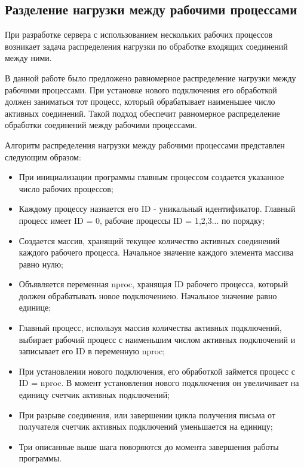 \documentclass[a4paper,12pt]{report}
\begin{document}
\subsection{Разделение нагрузки между рабочими процессами}

При разработке сервера с использованием нескольких рабочих процессов возникает задача распределения нагрузки по обработке входящих соединений между ними. 

В данной работе было предложено равномерное распределение нагрузки между рабочими процессами. При установке нового подключения его обработкой должен заниматься тот процесс, который обрабатывает наименьшее число активных соединений. Такой подход обеспечит равномерное распределение обработки соединений между рабочими процессами.

Алгоритм распределения нагрузки между рабочими процессами представлен следующим образом:

\begin{itemize}
	
		\item При инициализации программы главным процессом создается указанное число рабочих процессов;
		\item Каждому процессу назнается его ID - уникальный идентификатор. Главный процесс имеет ID = 0, рабочие процессы ID = 1,2,3... по порядку;
		\item Создается массив, хранящий текущее количество активных соединений каждого рабочего процесса. Начальное значение каждого элемента массива равно нулю;
		\item Объявляется переменная nproc, хранящая ID рабочего процесса, который должен обрабатывать новое подключениею. Начальное значение равно единице; 
		\item Главный процесс, используя массив количества активных подключений, выбирает рабочий процесс с наименьшим числом активных подключений и записывает его ID в переменную nproc;
		\item При установлении нового подключения, его обработкой займется процесс с ID = nproc. В момент установления нового подключения он увеличивает на единицу счетчик активных подключений;
		\item При разрыве соединения, или завершении цикла получения письма от получателя счетчик активных подключений уменьшается на единицу;			
		\item Три описанные выше шага поворяются до момента завершения работы программы.

\end{itemize}
\end{document}
